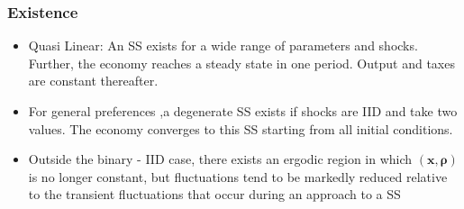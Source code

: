 \documentclass{beamer}
\begin{document}
\begin{frame}
\frametitle{Existence}
\begin{itemize}
 \item Quasi Linear: An SS exists for a wide range of parameters and shocks.
 Further, the economy reaches a steady state in one period. Output and taxes are constant thereafter.
 \item For general preferences ,a degenerate SS exists if shocks are IID and take two values. The economy converges to this SS starting from all initial conditions.
 \item Outside the binary - IID case, there exists an ergodic region in which $\left( \bm{x},\bm{\rho} \right) $ is no longer constant, but  fluctuations tend to be markedly reduced relative to the transient fluctuations that occur during an approach to  a SS
\end{itemize}
\end{frame}
\end{document}

